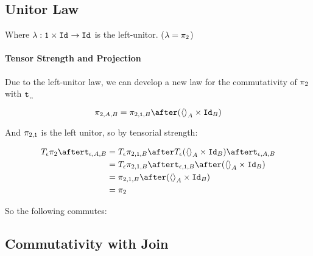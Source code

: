 \documentclass{Report}
\begin{document}
\subsection{Unitor Law}
Where $\lambda: \texttt{\texttt{1}} \times \texttt{Id}_{} \rightarrow \texttt{Id}_{}$ is the left-unitor.
($\lambda = \pi_2$)

\paragraph{Tensor Strength and Projection}
Due to the left-unitor law, we can develop a new law for the commutativity of $\pi_2$ with $\texttt{t}_{, , }$

    $$\pi_{2, A, B} = \pi_{2, \1, B} \after (\term{A} \times \Id{B})$$

    And $\pi_{2, \texttt{1}}$ is the left unitor, so by tensorial strength:
    
    \begin{equation}
        \begin{split}
            \T{\e}{\pp} \after \tstrength{\e}{A}{B} & = \T{\e}{\pi_{2, \1, B}} \after \T{\e}{(\term{A} \times \Id{B})} \after \tstrength{\e}{A}{B} \\
            & = \T{\e}{\pi_{2, 1, B}} \after \tstrength{\e}{\1}{B} \after (\term{A} \times \Id{B}) \\
            & = \pi_{2,1,B} \after (\term{A} \times \Id{B}) \\
            & = \pp
        \end{split}
    \end{equation}

So the following commutes:



\subsection{Commutativity with Join}
\end{document}
